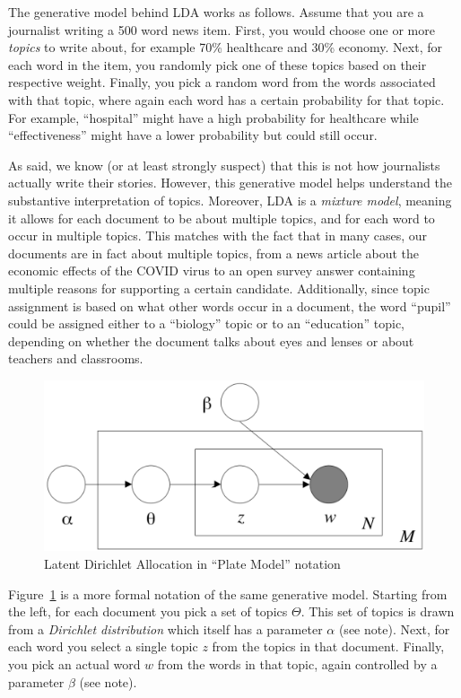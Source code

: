 The generative model behind LDA works as follows.
Assume that you are a journalist writing a 500 word news item.
First, you would choose one or more \emph{topics} to write about,
for example 70\% healthcare and 30\% economy.
Next, for each word in the item, you randomly pick one of these topics based on their respective weight.
Finally, you pick a random word from the words associated with that topic,
where again each word has a certain probability for that topic.
For example, ``hospital'' might have a high probability for healthcare while ``effectiveness'' might have a lower probability but could still occur.

As said, we know (or at least strongly suspect) that this is not how journalists actually write their stories.
However, this generative model helps understand the substantive interpretation of topics.
Moreover, LDA is a \emph{mixture model}, meaning it allows for each document to be about multiple topics, and for each word to occur in multiple topics.
This matches with the fact that in many cases, our documents are in fact about multiple topics,
from a news article about the economic effects of the COVID virus to an open survey answer containing multiple reasons for supporting a certain candidate.
Additionally, since topic assignment is based on what other words occur in a document,
the word ``pupil'' could be assigned either to a ``biology'' topic or to an ``education'' topic, depending
on whether the document talks about eyes and lenses or about teachers and classrooms.

\begin{figure}
  \includegraphics[width=\linewidth]{chapter11/lda.png}
  \caption{Latent Dirichlet Allocation in ``Plate Model'' notation \citep[fig. 1]{blei03}}\label{fig:lda}
\end{figure}

Figure~\ref{fig:lda} is a more formal notation of the same generative model.
Starting from the left, for each document you pick a set of topics $\Theta$.
This set of topics is drawn from a \emph{Dirichlet distribution} which itself has a parameter $\alpha$
(see note).
Next, for each word you select a single topic $z$ from the topics in that document.
Finally, you pick an actual word $w$ from the words in that topic, again controlled by a parameter $\beta$ (see note).

